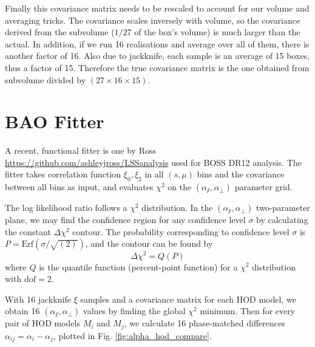 \documentclass[fleqn,usenatbib]{mnras}
\begin{document}
		Finally this covariance matrix needs to be rescaled to account for our volume and averaging tricks. The covariance scales inversely with volume, so the covariance derived from the subvolume ($1/27$ of the box's volume) is much larger than the actual. In addition, if we run 16 realisations and average over all of them, there is another factor of 16. Also due to jackknife, each sample is an average of 15 boxes, thus a factor of 15. Therefore the true covariance matrix is the one obtained from subvolume divided by $ ( 27\times 16 \times 15 )$.
		
\section{BAO Fitter}

	A recent, functional fitter is one by Ross \url{https://github.com/ashleyjross/LSSanalysis} used for BOSS DR12 analysis. The fitter takes correlation function $\xi_0, \xi_2$ in all $(s,\mu)$ bins and the covariance between all bins as input, and evaluates $\chi^2$ on the $(\alpha_\varparallel, \alpha_\perp)$ parameter grid.
	
	The log likelihood ratio follows a $\chi^2$ distribution. In the $(\alpha_\varparallel, \alpha_\perp)$ two-parameter plane, we may find the confidence region for any confidence level $\sigma$ by calculating the constant $\Delta\chi^2$ contour. The probability corresponding to confidence level $\sigma$ is $P = \mathrm{Erf} (\sigma / \sqrt{(2)})$, and the contour can be found by
	\begin{equation}
		\Delta \chi^2 = Q(P)
	\end{equation}
	where $Q$ is the quantile function (percent-point function) for a $\chi^2$ distribution with $\mathrm{dof}=2$.
	
	With 16 jackknife $\xi$ samples and a covariance matrix for each HOD model, we obtain 16 $ (\alpha_\varparallel, \alpha_\perp) $ values by finding the global $\chi^2$ minimum. Then for every pair of HOD models $M_i$ and $M_j$, we calculate 16 phase-matched differences $\alpha_{ij} = \alpha_i - \alpha_j$, plotted in Fig. \ref{fig:alpha_hod_compare}.
	
\end{document}
